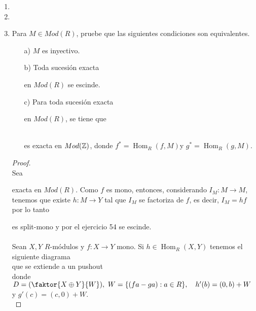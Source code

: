 \documentclass{article}
\begin{document}
\begin{enumerate}[label=\textbf{Ej \arabic*.}]
\begin{proof}
\end{proof}
\item
\item
\item Para $M\in Mod(R)$, pruebe que las siguientes condiciones son equivalentes.
\begin{itemize}
\item[a)] $M$ es inyectivo.
\item[b)] Toda sucesión exacta 
en $Mod(R)$ se escinde.
\item[c)] Para toda sucesión exacta 
 en $Mod(R)$, se tiene que \\
\\
es exacta en $Mod(\mathbb{Z})$, donde $f^*=\operatorname{Hom}_R(f,M)$\quad y \quad $g^*=\operatorname{Hom}_R(g,M)$.
\end{itemize}
\begin{proof}
 \\
Sea 
exacta en $Mod(R)$. Como $f$ es mono, entonces, considerando $I_M\colon M\longrightarrow M$, tenemos que existe $h\colon M\longrightarrow Y$
tal que $I_M$ se factoriza de $f$, es decir, $I_M=hf$ por lo tanto 
es split-mono y por el ejercicio 54 se escinde.\\
 \\
Sean $X,Y$ $R$-módulos y $f\colon X\longrightarrow Y$ mono. Si $h\in \operatorname{Hom}_R(X,Y)$ tenemos el siguiente diagrama\quad
{}\\
que se extiende a un pushout \quad\quad
{}\\
donde $D=(\faktor{X\oplus Y}{W}),\,\, W=\{(fa-ga):a\in R\}, \quad h'(b)=(0,b)+W$ y $g'(c)=(c,0)+W$.\\


\end{proof}
\end{enumerate}
\end{document}
